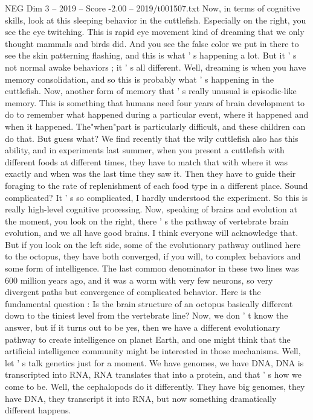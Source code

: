 \begin{textsample}{NEG Dim 3 – 2019 – Score -2.00 – 2019/t001507.txt}
Now, in terms of cognitive skills, look at this sleeping behavior in the cuttlefish.
Especially on the right, you see the eye twitching.
This is rapid eye movement kind of dreaming that we only thought mammals and birds did.
And you see the false color we put in there to see the skin patterning flashing, and this is what ' s happening a lot.
But it ' s not normal awake behaviors ; it ' s all different.
Well, dreaming is when you have memory consolidation, and so this is probably what ' s happening in the cuttlefish.
Now, another form of memory that ' s really unusual is episodic-like memory.
This is something that humans need four years of brain development to do to remember what happened during a particular event, where it happened and when it happened.
The"when"part is particularly difficult, and these children can do that.
But guess what?
We find recently that the wily cuttlefish also has this ability, and in experiments last summer, when you present a cuttlefish with different foods at different times, they have to match that with where it was exactly and when was the last time they saw it.
Then they have to guide their foraging to the rate of replenishment of each food type in a different place.
Sound complicated?
It ' s so complicated, I hardly understood the experiment.
So this is really high-level cognitive processing.
Now, speaking of brains and evolution at the moment, you look on the right, there ' s the pathway of vertebrate brain evolution, and we all have good brains.
I think everyone will acknowledge that.
But if you look on the left side, some of the evolutionary pathway outlined here to the octopus, they have both converged, if you will, to complex behaviors and some form of intelligence.
The last common denominator in these two lines was 600 million years ago, and it was a worm with very few neurons, so very divergent paths but convergence of complicated behavior.
Here is the fundamental question : Is the brain structure of an octopus basically different down to the tiniest level from the vertebrate line?
Now, we don ' t know the answer, but if it turns out to be yes, then we have a different evolutionary pathway to create intelligence on planet Earth, and one might think that the artificial intelligence community might be interested in those mechanisms.
Well, let ' s talk genetics just for a moment.
We have genomes, we have DNA, DNA is transcripted into RNA, RNA translates that into a protein, and that ' s how we come to be.
Well, the cephalopods do it differently.
They have big genomes, they have DNA, they transcript it into RNA, but now something dramatically different happens.

\end{textsample}
